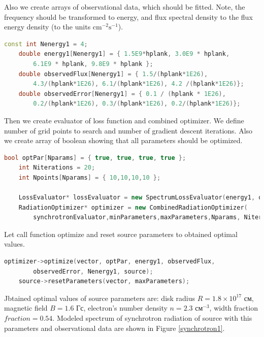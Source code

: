 Also we create arrays of observational data, which should be fitted. Note, the frequency should be transformed to energy, and flux spectral density to the flux energy density (to the units $\text{cm}^{-2}\text{s}^{-1}$). 
\begin{lstlisting}[language=c++]
    const int Nenergy1 = 4;
    double energy1[Nenergy1] = { 1.5E9*hplank, 3.0E9 * hplank, 
    	6.1E9 * hplank, 9.8E9 * hplank };
    double observedFlux[Nenergy1] = { 1.5/(hplank*1E26), 
    	4.3/(hplank*1E26), 6.1/(hplank*1E26), 4.2 /(hplank*1E26)};
    double observedError[Nenergy1] = { 0.1 / (hplank * 1E26), 
    	0.2/(hplank*1E26), 0.3/(hplank*1E26), 0.2/(hplank*1E26)};
\end{lstlisting}
Then we create evaluator of loss function and combined optimizer. We define number of grid points to search and number of gradient descent iterations. Also we create array of boolean showing that all parameters should be optimized.
\begin{lstlisting}[language=c++]
    bool optPar[Nparams] = { true, true, true, true };
    int Niterations = 20;
    int Npoints[Nparams] = { 10,10,10,10 };
    
    LossEvaluator* lossEvaluator = new SpectrumLossEvaluator(energy1, observedFlux, observedError, Nenergy1, source);
    RadiationOptimizer* optimizer = new CombinedRadiationOptimizer(
        synchrotronEvaluator,minParameters,maxParameters,Nparams, Niterations,Npoints, lossEvaluator);
\end{lstlisting}
Let call function optimize and reset source parameters to obtained optimal values.
\begin{lstlisting}[language=c++]
    optimizer->optimize(vector, optPar, energy1, observedFlux, 
        observedError, Nenergy1, source);
    source->resetParameters(vector, maxParameters);
\end{lstlisting}
Jbtained optimal values of source parameters are: disk radius $R = 1.8\times10^17 \text{ см}$, magnetic field $B = 1.6 \text{ Гс}$, electron's number density $n = 2.3 \text{ см}^{-3}$, width fraction $fraction = 0.54 $. 
Modeled spectrum of synchrotron radiation of source with this parameters and observational data are shown in Figure \ref{synchrotron1}.
